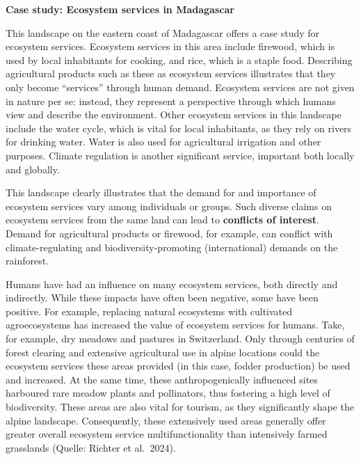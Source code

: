 \documentclass[
  a4paper,
  openany]{book}
\begin{document}
\begin{tcolorbox}[enhanced jigsaw, left=2mm, arc=.35mm, titlerule=0mm, opacityback=0, leftrule=.75mm, title={Tip}, breakable, bottomtitle=1mm, rightrule=.15mm, coltitle=black, toptitle=1mm, bottomrule=.15mm, colback=white, opacitybacktitle=0.6, colbacktitle=quarto-callout-tip-color!10!white, toprule=.15mm, colframe=quarto-callout-tip-color-frame]

\textbf{Case study: Ecosystem services in Madagascar}

This landscape on the eastern coast of Madagascar offers a case study
for ecosystem services. Ecosystem services in this area include
firewood, which is used by local inhabitants for cooking, and rice,
which is a staple food. Describing agricultural products such as these
as ecosystem services illustrates that they only become ``services''
through human demand. Ecosystem services are not given in nature per se:
instead, they represent a perspective through which humans view and
describe the environment. Other ecosystem services in this landscape
include the water cycle, which is vital for local inhabitants, as they
rely on rivers for drinking water. Water is also used for agricultural
irrigation and other purposes. Climate regulation is another significant
service, important both locally and globally.

This landscape clearly illustrates that the demand for and importance of
ecosystem services vary among individuals or groups. Such diverse claims
on ecosystem services from the same land can lead to \textbf{conflicts
of interest}. Demand for agricultural products or firewood, for example,
can conflict with climate-regulating and biodiversity-promoting
(international) demands on the rainforest.

\end{tcolorbox}

Humans have had an influence on many ecosystem services, both directly
and indirectly. While these impacts have often been negative, some have
been positive. For example, replacing natural ecosystems with cultivated
agroecosystems has increased the value of ecosystem services for humans.
Take, for example, dry meadows and pastures in Switzerland. Only through
centuries of forest clearing and extensive agricultural use in alpine
locations could the ecosystem services these areas provided (in this
case, fodder production) be used and increased. At the same time, these
anthropogenically influenced sites harboured rare meadow plants and
pollinators, thus fostering a high level of biodiversity. These areas
are also vital for tourism, as they significantly shape the alpine
landscape. Consequently, these extensively used areas generally offer
greater overall ecosystem service multifunctionality than intensively
farmed grasslands (Quelle: Richter et al.~2024).
\end{document}
